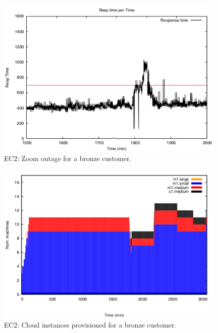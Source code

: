 \begin{figure}
  \begin{center}
    \includegraphics[width=.85\linewidth]{images/exps2011/low/ec2/proxyDataPoints_output_filtered.pdf}
  \end{center}
\vspace{-5mm}
  \caption{EC2: Zoom outage for a bronze customer.}
  \label{zoomOutage}
\end{figure}

\begin{figure}
  \begin{center}
    \includegraphics[width=.85\linewidth]{images/exps2011/low/ec2/inst_type_machines.pdf}
  \end{center}
\vspace{-5mm}
  \caption{EC2: Cloud instances provisioned for a bronze customer.}
  \label{lowInstances}
\end{figure}

